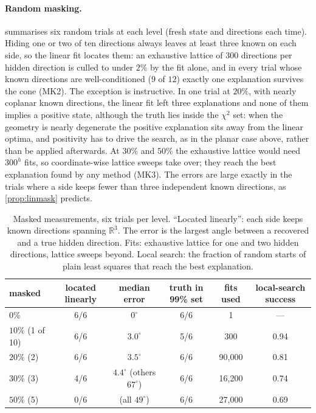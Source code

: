 \documentclass[11pt]{article}
\theoremstyle{definition}\newtheorem{definition}[theorem]{Definition}\newtheorem{remark}[theorem]{Remark}\newtheorem{example}[theorem]{Example}
\newcommand{\R}{\mathbb R}
\begin{document}
\paragraph{Random masking.}
 summarises six random trials at each level (fresh state and directions each time). Hiding one or two of ten directions
always leaves at least three known on each side, so the linear fit locates them: an exhaustive lattice of $300$ directions per hidden
direction is culled to under $2\%$ by the fit alone, and in every trial whose known directions are well-conditioned ($9$ of $12$) exactly one
explanation survives the cone (MK2). The exception is instructive. In one trial at $20\%$, with nearly coplanar known directions, the linear
fit left three explanations and none of them implies a positive state, although the truth lies inside the $\chi^2$ set: when the geometry
is nearly degenerate the positive explanation sits away from the linear optima, and positivity has to drive the search, as in the planar
case above, rather than be applied afterwards. At $30\%$ and $50\%$ the exhaustive lattice would
need $300^h$ fits, so coordinate-wise lattice sweeps take over; they reach the best explanation found by any method (MK3). The errors are
large exactly in the trials where a side keeps fewer than three independent known directions, as \cref{prop:linmask} predicts.

\begin{table}[!htbp]\centering\small
\begin{tabular}{lccccc}\toprule
masked & located linearly & median error & truth in 99\% set & fits used & local-search success\\\midrule
$0\%$ & 6/6 & $0^\circ$ & 6/6 & 1 & ---\\
$10\%$ (1 of 10) & 6/6 & $3.0^\circ$ & 5/6 & 300 & 0.94\\
$20\%$ (2) & 6/6 & $3.5^\circ$ & 6/6 & 90{,}000 & 0.81\\
$30\%$ (3) & 4/6 & $4.4^\circ$ (others $67^\circ$) & 6/6 & 16{,}200 & 0.74\\
$50\%$ (5) & 0/6 & (all $49^\circ$) & 6/6 & 27{,}000 & 0.69\\\bottomrule
\end{tabular}
\caption{Masked measurements, six trials per level. ``Located linearly'': each side keeps known directions spanning $\R^3$. The error is
the largest angle between a recovered and a true hidden direction. Fits: exhaustive lattice for one and two hidden directions, lattice
sweeps beyond. Local search: the fraction of random starts of plain least squares that reach the best explanation.}\label{tab:masked}
\end{table}
\end{document}
